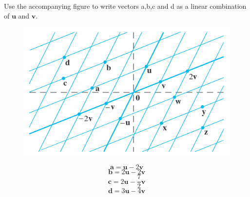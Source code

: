 \documentclass{mathhomework}
\newcommand{\Vect}[1]{\pmb{#1}}
\begin{document}
\pagebreak
\begin{problem}[1.3\#7]
    Use the accompanying figure to write vectors a,b,c and d as a linear combination of $\Vect{u}$ and $\Vect{v}$.

    \begin{figure}[H]
        \begin{center}
            \includegraphics[width=5in]{figures/1_3_7.png}
        \end{center}
    \end{figure}

    \begin{solution}
        \begin{equation*}
            \Vect{a} = \Vect{u} - 2\Vect{v}
        \end{equation*}
        \begin{equation*}
            \Vect{b} = 2\Vect{u} - 2\Vect{v}
        \end{equation*}
        \begin{equation*}
            \Vect{c} = 2\Vect{u} - \frac{7}{2}\Vect{v}
        \end{equation*}
        \begin{equation*}
            \Vect{d} = 3\Vect{u} - 4\Vect{v}
        \end{equation*}
    \end{solution}
\end{problem}
\end{document}
